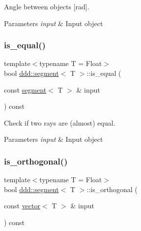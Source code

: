 Angle between objects \mbox{[}rad\mbox{]}. 


\begin{DoxyParams}{Parameters}
{\em input} & Input object \\
\hline
\end{DoxyParams}
\mbox{\label{classddd_1_1segment_ae8acfec0892da591ad0dfcf583683275}} 
\subsubsection{\texorpdfstring{is\+\_\+equal()}{is\_equal()}}
{\footnotesize\ttfamily template$<$typename T = Float$>$ \\
bool \hyperlink{classddd_1_1segment}{ddd\+::segment}$<$ T $>$\+::is\+\_\+equal (\begin{DoxyParamCaption}\item[{const \hyperlink{classddd_1_1segment}{segment}$<$ T $>$ \&}]{input }\end{DoxyParamCaption}) const\hspace{0.3cm}{\ttfamily [inline]}}



Check if two rays are (almost) equal. 


\begin{DoxyParams}{Parameters}
{\em input} & Input object \\
\hline
\end{DoxyParams}
\mbox{\label{classddd_1_1segment_ab07434a63e42e1afd1a1ef2927cd1b7d}} 
\subsubsection{\texorpdfstring{is\+\_\+orthogonal()}{is\_orthogonal()}\hspace{0.1cm}{\footnotesize\ttfamily [1/5]}}
{\footnotesize\ttfamily template$<$typename T = Float$>$ \\
bool \hyperlink{classddd_1_1segment}{ddd\+::segment}$<$ T $>$\+::is\+\_\+orthogonal (\begin{DoxyParamCaption}\item[{const \hyperlink{classddd_1_1vector}{vector}$<$ T $>$ \&}]{input }\end{DoxyParamCaption}) const\hspace{0.3cm}{\ttfamily [inline]}}



